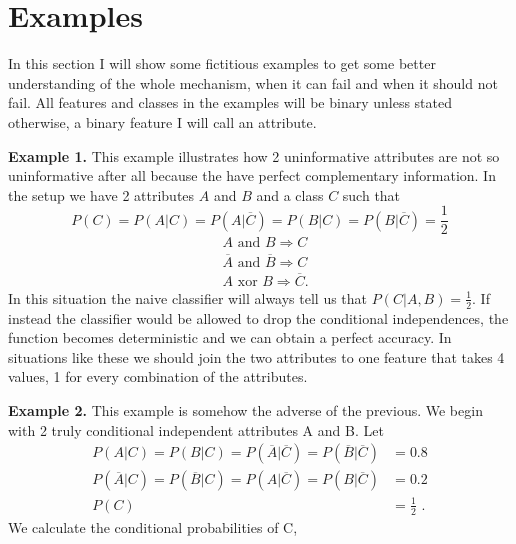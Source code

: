 \documentclass{report}
\theoremstyle{definition}
\begin{document}
\section{Examples} 
In this section I will show some fictitious examples to get some better understanding of the whole mechanism, when it can fail and when it should not fail. All features and classes in the examples will be binary unless stated otherwise, a binary feature I will call an attribute.\bigskip

\textbf{Example 1.} This example illustrates how 2 uninformative attributes are not so uninformative after all because the have perfect complementary information. In the setup we have 2 attributes $A$ and $B$ and a class $C$ such that $$P(C)=P(A|C)=P(A|\overline{C})=P(B|C)=P(B|\overline{C})=\frac{1}{2} $$ 
\begin{equation*}
\begin{split}
& A \text{ and } B \Rightarrow C \\
& \overline{A} \textrm{ and } \overline{B} \Rightarrow C \\
& A \textrm{ xor } B \Rightarrow \overline{C}.
\end{split}
\end{equation*}
In this situation the naive classifier will always tell us that $P(C|A,B)=\frac{1}{2}$. If instead the classifier would be allowed to drop the conditional independences, the function becomes deterministic and we can obtain a perfect accuracy. In situations like these we should join the two attributes to one feature that takes 4 values, 1 for every combination of the attributes. \bigskip

\textbf{Example 2.} This example is somehow the adverse of the previous. We begin with 2 truly conditional independent attributes A and B. Let
\begin{equation*}
\begin{split}
P(A|C)=P(B|C)=P(\overline{A}|\overline{C})=P(\overline{B}|\overline{C})&=0.8\\
P(\overline{A}|C)=P(\overline{B}|C)=P(A|\overline{C})=P(B|\overline{C})&=0.2\\
P(C)&=\frac{1}{2}\text{ .}
\end{split}
\end{equation*} 
We calculate the conditional probabilities of C, 
\end{document}
